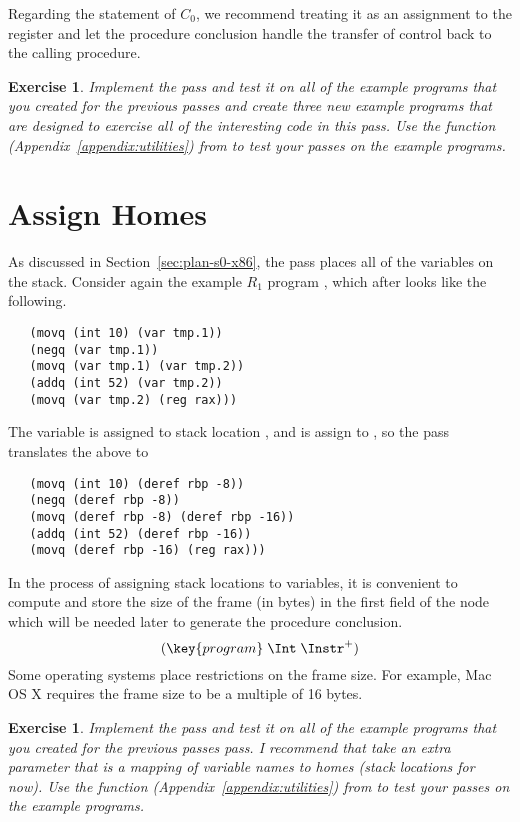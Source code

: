 \documentclass[11pt]{book}
\newtheorem{exercise}[theorem]{Exercise}
\begin{document}
Regarding the \RETURN{\Arg} statement of $C_0$, we recommend treating it
as an assignment to the  register and let the procedure
conclusion handle the transfer of control back to the calling
procedure.

\begin{exercise}
\normalfont
Implement the  pass and test it on all of the
example programs that you created for the previous passes and create
three new example programs that are designed to exercise all of the
interesting code in this pass. Use the  function
(Appendix~\ref{appendix:utilities}) from  to test
your passes on the example programs.
\end{exercise}

\section{Assign Homes}
\label{sec:assign-s0}

As discussed in Section~\ref{sec:plan-s0-x86}, the
 pass places all of the variables on the stack.
Consider again the example $R_1$ program ,
which after  looks like the following.
\begin{lstlisting}
   (movq (int 10) (var tmp.1))
   (negq (var tmp.1))
   (movq (var tmp.1) (var tmp.2))
   (addq (int 52) (var tmp.2))
   (movq (var tmp.2) (reg rax)))
\end{lstlisting}
The variable  is assigned to stack location
, and  is assign to , so
the  pass translates the above to
\begin{lstlisting}
   (movq (int 10) (deref rbp -8))
   (negq (deref rbp -8))
   (movq (deref rbp -8) (deref rbp -16))
   (addq (int 52) (deref rbp -16))
   (movq (deref rbp -16) (reg rax)))
\end{lstlisting}

In the process of assigning stack locations to variables, it is
convenient to compute and store the size of the frame (in bytes) in
the first field of the  node which will be needed later
to generate the procedure conclusion.
\[
  (\key{program}\;\Int\;\Instr^{+})
\]
Some operating systems place restrictions on
the frame size. For example, Mac OS X requires the frame size to be a
multiple of 16 bytes.

\begin{exercise}
\normalfont Implement the  pass and test it on all
of the example programs that you created for the previous passes pass.
I recommend that  take an extra parameter that is a
mapping of variable names to homes (stack locations for now).  Use the
 function (Appendix~\ref{appendix:utilities}) from
 to test your passes on the example programs.
\end{exercise}
\end{document}
